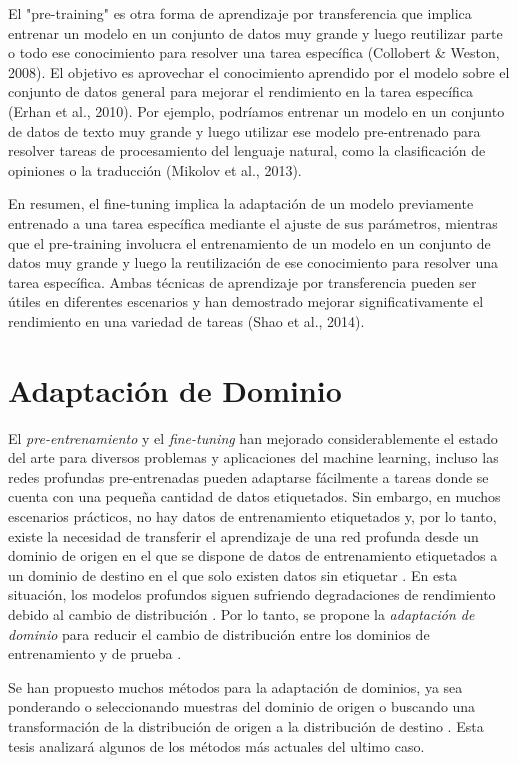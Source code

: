 El "pre-training" es otra forma de aprendizaje por transferencia que implica entrenar un modelo en un conjunto de datos
muy grande y luego reutilizar parte o todo ese conocimiento para resolver una tarea específica (Collobert \& Weston,
2008). El objetivo es aprovechar el conocimiento aprendido por el modelo sobre el conjunto de datos general para
mejorar el rendimiento en la tarea específica (Erhan et al., 2010). Por ejemplo, podríamos entrenar un modelo en un
conjunto de datos de texto muy grande y luego utilizar ese modelo pre-entrenado para resolver tareas de procesamiento
del lenguaje natural, como la clasificación de opiniones o la traducción (Mikolov et al., 2013).

En resumen, el fine-tuning implica la adaptación de un modelo previamente entrenado a una tarea específica mediante el
ajuste de sus parámetros, mientras que el pre-training involucra el entrenamiento de un modelo en un conjunto de datos
muy grande y luego la reutilización de ese conocimiento para resolver una tarea específica. Ambas técnicas de
aprendizaje por transferencia pueden ser útiles en diferentes escenarios y han demostrado mejorar significativamente el
rendimiento en una variedad de tareas (Shao et al., 2014).

\section{Adaptaci\'on de Dominio}
El {\it pre-entrenamiento} y el {\it fine-tuning} han mejorado considerablemente el estado del arte para diversos
problemas y aplicaciones del machine learning, incluso las redes profundas pre-entrenadas pueden adaptarse fácilmente a
tareas donde se cuenta con una pequeña cantidad de datos etiquetados. Sin embargo, en muchos escenarios prácticos, no
hay datos de entrenamiento etiquetados y, por lo tanto, existe la necesidad de transferir el aprendizaje de una red
profunda desde un dominio de origen en el que se dispone de datos de entrenamiento etiquetados a un dominio de destino
en el que solo existen datos sin etiquetar \parencite{glorot2011domain}. En esta situación, los modelos profundos siguen sufriendo degradaciones de rendimiento debido
al cambio de distribución \parencite{quinonero2008dataset}. Por lo tanto, se propone la {\it adaptación de dominio} para reducir el cambio de
distribución entre los dominios de entrenamiento y de prueba \parencite{jiang2022machine}.

Se han propuesto muchos métodos para la adaptación de dominios, ya sea ponderando o seleccionando muestras del dominio
de origen \parencite{sugiyama2007direct} o buscando una transformación de la distribución de origen a la distribución de destino \parencite{gong2013connecting}. Esta tesis analizar\'a algunos de los m\'etodos m\'as actuales del ultimo caso.

